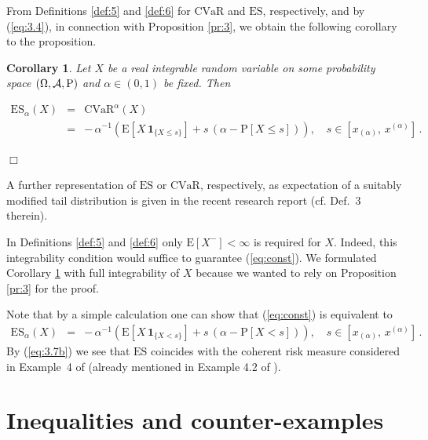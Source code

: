 \documentclass[11pt,a4paper,leqno]{article}
\newtheorem{corollary}[theorem]{Corollary}
\begin{document}
From Definitions  \ref{def:5} and \ref{def:6} for $\mathrm{CVaR}$ and  $\mathrm{ES}$, respectively, and by (\ref{eq:3.4}), in connection
with Proposition \ref{pr:3}, we obtain the following corollary to  the proposition.
\begin{corollary}
  \label{co:1}
Let $X$ be a real  integrable random variable
on some probability space $(\Omega, {\cal A}, \mathrm{P})$ and $\alpha \in (0,1)$ be fixed.
Then\\
\begin{minipage}[b]{14cm}
\begin{eqnarray}
\mathrm{ES}_\alpha(X) & = & 
\mathrm{CVaR}^\alpha(X)\nonumber
\\
& = & -\,\alpha^{-1} \left( \mathrm{E}[ X\,\mathbf{1}_{\{X \le s\}} ] + s\,(\alpha - 
\mathrm{P}[X \le s])\right),\quad s \in  [ x_{(\alpha)},\, x^{(\alpha)}]\,.
\label{eq:const}
\end{eqnarray}
\end{minipage}
\hfill
\parbox[t]{1cm}{\hfill $\Box$}
\end{corollary}
%
A further representation of $\mathrm{ES}$ or $\mathrm{CVaR}$, respectively, as expectation
of a suitably modified tail distribution is given
in the recent research report \cite{RU01} (cf. Def.~3 therein).

In Definitions \ref{def:5} and \ref{def:6} only $\mathrm{E}[X^-] < \infty$ is required for $X$.
Indeed, this integrability condition would suffice to guarantee (\ref{eq:const}). We formulated
Corollary \ref{co:1} with full integrability of $X$ because we wanted to rely on Proposition \ref{pr:3}
for the proof.

Note that by a simple calculation one can show that (\ref{eq:const}) is equivalent to
\begin{eqnarray}
\mathrm{ES}_\alpha(X) 
& = & - \,\alpha^{-1} \left( \mathrm{E}[ X\,\mathbf{1}_{\{X < s\}} ] + s\,(\alpha - 
\mathrm{P}[X < s])\right),\quad s \in  [ x_{(\alpha)},\, x^{(\alpha)}]\,. \label{eq:3.7b}
\end{eqnarray}
By (\ref{eq:3.7b}) we see that $\mathrm{ES}$ coincides with the coherent risk measure considered
in Example~4 of \cite{Delb01} (already mentioned in Example 4.2 of \cite{Delb98}).


\section{Inequalities and counter-examples}
\label{sec:ineq}
\setcounter{equation}{0}
\end{document}
